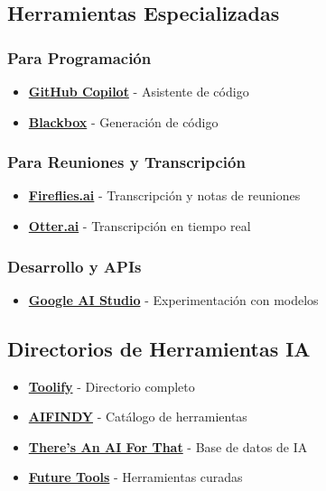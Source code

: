 \documentclass[
  jou,
  floatsintext,
  longtable,
  a4paper,
  nolmodern,
  notxfonts,
  notimes,
  12pt,
  colorlinks=true,linkcolor=blue,citecolor=blue,urlcolor=blue]{apa7}
\providecommand{\tightlist}{%
  \setlength{\itemsep}{0pt}\setlength{\parskip}{0pt}}
\begin{document}
\subsection{Herramientas
Especializadas}\label{herramientas-especializadas}

\subsubsection{Para Programación}\label{para-programaciuxf3n}

\begin{itemize}
\tightlist
\item
  \textbf{\href{https://github.com/copilot}{GitHub Copilot}} - Asistente
  de código
\item
  \textbf{\href{https://www.blackbox.ai/}{Blackbox}} - Generación de
  código
\end{itemize}

\subsubsection{Para Reuniones y
Transcripción}\label{para-reuniones-y-transcripciuxf3n}

\begin{itemize}
\tightlist
\item
  \textbf{\href{https://app.fireflies.ai/}{Fireflies.ai}} -
  Transcripción y notas de reuniones
\item
  \textbf{\href{https://otter.ai/}{Otter.ai}} - Transcripción en tiempo
  real
\end{itemize}

\subsubsection{Desarrollo y APIs}\label{desarrollo-y-apis}

\begin{itemize}
\tightlist
\item
  \textbf{\href{https://aistudio.google.com/}{Google AI Studio}} -
  Experimentación con modelos
\end{itemize}

\subsection{Directorios de Herramientas
IA}\label{directorios-de-herramientas-ia}

\begin{itemize}
\tightlist
\item
  \textbf{\href{https://www.toolify.ai/es/}{Toolify}} - Directorio
  completo
\item
  \textbf{\href{https://aifindy.com/}{AIFINDY}} - Catálogo de
  herramientas
\item
  \textbf{\href{https://theresanaiforthat.com/}{There's An AI For That}}
  - Base de datos de IA
\item
  \textbf{\href{https://www.futuretools.io/}{Future Tools}} -
  Herramientas curadas
\end{itemize}
\end{document}

